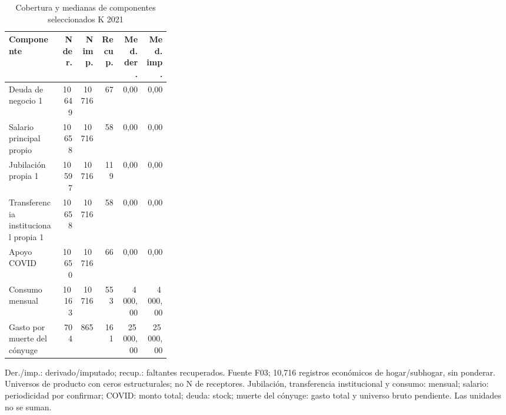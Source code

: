 \begin{table}[!htbp]
\centering
\caption{Cobertura y medianas de componentes seleccionados K 2021}\label{tab:eda-k2021-componentes}
\small\setlength{\tabcolsep}{4pt}
\renewcommand{\arraystretch}{1.15}
\begin{tabular}{p{0.32\linewidth}rrrrr}
\toprule
\textbf{Componente} & \textbf{N der.} & \textbf{N imp.} & \textbf{Recup.} & \textbf{Med. der.} & \textbf{Med. imp.} \\
\midrule
Deuda de negocio 1 & 10\,649 & 10\,716 & 67 & 0,00 & 0,00 \\
Salario principal propio & 10\,658 & 10\,716 & 58 & 0,00 & 0,00 \\
Jubilación propia 1 & 10\,597 & 10\,716 & 119 & 0,00 & 0,00 \\
Transferencia institucional propia 1 & 10\,658 & 10\,716 & 58 & 0,00 & 0,00 \\
Apoyo COVID & 10\,650 & 10\,716 & 66 & 0,00 & 0,00 \\
Consumo mensual & 10\,163 & 10\,716 & 553 & 4\,000,00 & 4\,000,00 \\
Gasto por muerte del cónyuge & 704 & 865 & 161 & 25\,000,00 & 25\,000,00 \\
\bottomrule
\end{tabular}
\par\medskip
\parbox{\linewidth}{\footnotesize Der./imp.: derivado/imputado; recup.: faltantes recuperados. Fuente F03; 10,716 registros económicos de hogar/subhogar, sin ponderar. Universos de producto con ceros estructurales; no N de receptores. Jubilación, transferencia institucional y consumo: mensual; salario: periodicidad por confirmar; COVID: monto total; deuda: stock; muerte del cónyuge: gasto total y universo bruto pendiente. Las unidades no se suman.}
\end{table}
